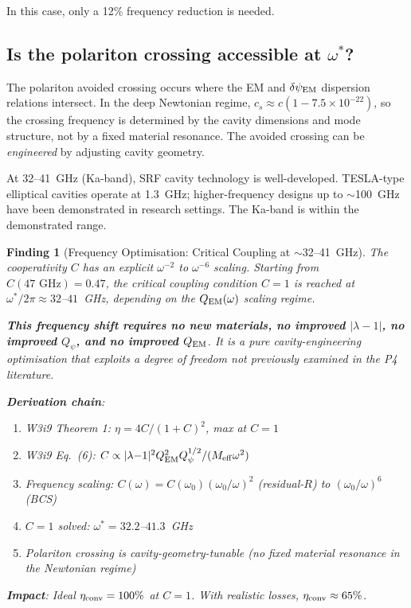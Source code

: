 \documentclass[11pt]{article}
\newtheorem{finding}{Finding}
\newcommand{\ee}[1]{\times 10^{#1}}
\newcommand{\dpsiEM}{\delta\psi_{\rm EM}}
\newcommand{\Meff}{M_{\rm eff}}
\newcommand{\lambdaone}{|\lambda{-}1|}
\newcommand{\Qpsi}{Q_\psi}
\newcommand{\QEM}{Q_{\rm EM}}
\begin{document}
In this case, only a 12\% frequency reduction is needed.

\subsection{Is the polariton crossing accessible at $\omega^*$?}

The polariton avoided crossing occurs where the EM and $\dpsiEM$ dispersion
relations intersect. In the deep Newtonian regime, $c_s \approx c(1 -
7.5\ee{-22})$, so the crossing frequency is determined by the cavity
dimensions and mode structure, not by a fixed material resonance. The
avoided crossing can be \emph{engineered} by adjusting cavity geometry.

At 32--41~GHz (Ka-band), SRF cavity technology is well-developed. TESLA-type
elliptical cavities operate at 1.3~GHz; higher-frequency designs up to
$\sim$100~GHz have been demonstrated in research settings. The Ka-band is
within the demonstrated range.

\begin{finding}[Frequency Optimisation: Critical Coupling at $\sim$32--41~GHz]
\label{find:frequency-optimization}
The cooperativity $C$ has an explicit $\omega^{-2}$ to $\omega^{-6}$
scaling. Starting from $C(47\text{~GHz}) = 0.47$, the critical coupling
condition $C = 1$ is reached at $\omega^*/2\pi \approx 32$--$41$~GHz,
depending on the $\QEM(\omega)$ scaling regime.

\textbf{This frequency shift requires no new materials, no improved
$\lambdaone$, no improved $\Qpsi$, and no improved $\QEM$}. It is a
pure cavity-engineering optimisation that exploits a degree of freedom
not previously examined in the P4 literature.

\textbf{Derivation chain}:
\begin{enumerate}[nosep]
\item W3i9 Theorem 1: $\eta = 4C/(1+C)^2$, max at $C=1$
\item W3i9 Eq.~(6): $C \propto \lambdaone^2 \QEM^2 \Qpsi^{1/2}
  / (\Meff \omega^2)$
\item Frequency scaling: $C(\omega) = C(\omega_0)(\omega_0/\omega)^2$
  (residual-$R$) to $(\omega_0/\omega)^6$ (BCS)
\item $C = 1$ solved: $\omega^* = 32.2$--$41.3$~GHz
\item Polariton crossing is cavity-geometry-tunable (no fixed material
  resonance in the Newtonian regime)
\end{enumerate}

\textbf{Impact}: Ideal $\eta_{\rm conv} = 100\%$ at $C = 1$.
With realistic losses, $\eta_{\rm conv} \approx 65\%$.
\end{finding}
\end{document}
